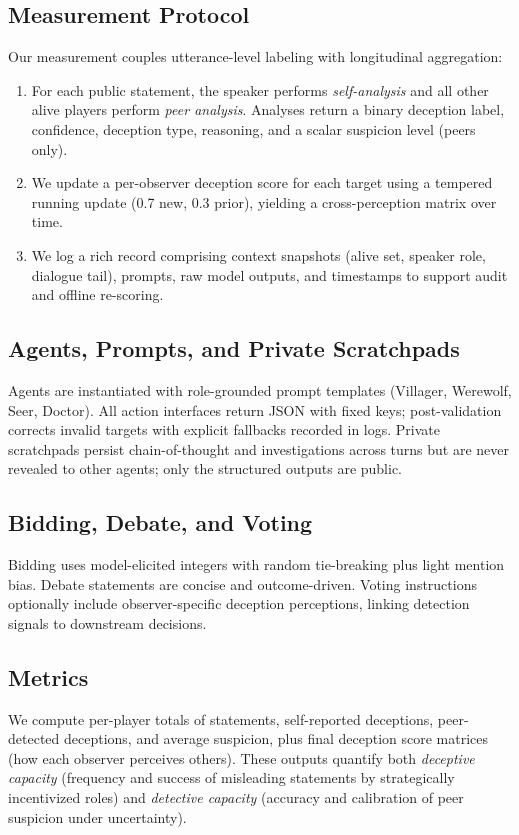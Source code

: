 \documentclass{article}
\begin{document}
\subsection{Measurement Protocol}
Our measurement couples utterance-level labeling with longitudinal aggregation:
\begin{enumerate}
    \item For each public statement, the speaker performs \emph{self-analysis} and all other alive players perform \emph{peer analysis}. Analyses return a binary deception label, confidence, deception type, reasoning, and a scalar suspicion level (peers only).
    \item We update a per-observer deception score for each target using a tempered running update (0.7 new, 0.3 prior), yielding a cross-perception matrix over time.
    \item We log a rich record comprising context snapshots (alive set, speaker role, dialogue tail), prompts, raw model outputs, and timestamps to support audit and offline re-scoring.
\end{enumerate}

\subsection{Agents, Prompts, and Private Scratchpads}
Agents are instantiated with role-grounded prompt templates (Villager, Werewolf, Seer, Doctor). All action interfaces return JSON with fixed keys; post-validation corrects invalid targets with explicit fallbacks recorded in logs. Private scratchpads persist chain-of-thought and investigations across turns but are never revealed to other agents; only the structured outputs are public.

\subsection{Bidding, Debate, and Voting}
Bidding uses model-elicited integers with random tie-breaking plus light mention bias. Debate statements are concise and outcome-driven. Voting instructions optionally include observer-specific deception perceptions, linking detection signals to downstream decisions.

\subsection{Metrics}
We compute per-player totals of statements, self-reported deceptions, peer-detected deceptions, and average suspicion, plus final deception score matrices (how each observer perceives others). These outputs quantify both \emph{deceptive capacity} (frequency and success of misleading statements by strategically incentivized roles) and \emph{detective capacity} (accuracy and calibration of peer suspicion under uncertainty).
\end{document}

